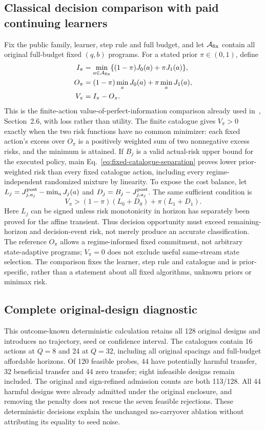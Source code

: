 \subsection{Classical decision comparison with paid continuing learners}
Fix the public family, learner, step rule and full budget, and let $\mathcal A_{\rm fix}$ contain all original full-budget fixed $(q,b)$ programs.
For a stated prior $\pi\in(0,1)$, define
\begin{align*}
I_\pi&=\min_{a\in\mathcal A_{\rm fix}}\{(1-\pi)J_0(a)+\pi J_1(a)\},\\
O_\pi&=(1-\pi)\min_aJ_0(a)+\pi\min_aJ_1(a),\\
V_\pi&=I_\pi-O_\pi.
\end{align*}
This is the finite-action value-of-perfect-information comparison already used in~, Section~2.6, with loss rather than utility.
The finite catalogue gives $V_\pi>0$ exactly when the two risk functions have no common minimizer: each fixed action's excess over $O_\pi$ is a positively weighted sum of two nonnegative excess risks, and the minimum is attained.
If $B_j$ is a valid actual-risk upper bound for the executed policy, main Eq.~\eqref{eq:fixed-catalogue-separation} proves lower prior-weighted risk than every fixed catalogue action, including every regime-independent randomized mixture by linearity.
To expose the cost balance, let $L_j=J_{j,a_j}^{\rm post}-\min_aJ_j(a)$ and $D_j=B_j-J_{j,a_j}^{\rm post}$.
The same sufficient condition is
\begin{equation}
V_\pi>(1-\pi)(L_0+D_0)+\pi(L_1+D_1).
\label{eq:supp-paid-opportunity}
\end{equation}
Here $L_j$ can be signed unless risk monotonicity in horizon has separately been proved for the affine transient.
Thus decision opportunity must exceed remaining-horizon and decision-event risk, not merely produce an accurate classification.
The reference $O_\pi$ allows a regime-informed fixed commitment, not arbitrary state-adaptive programs; $V_\pi=0$ does not exclude useful same-stream state selection.
The comparison fixes the learner, step rule and catalogue and is prior-specific, rather than a statement about all fixed algorithms, unknown priors or minimax risk.

\subsection{Complete original-design diagnostic}
This outcome-known deterministic calculation retains all 128 original designs and introduces no trajectory, seed or confidence interval.
The catalogues contain 16 actions at $Q=8$ and 24 at $Q=32$, including all original spacings and full-budget affordable horizons.
Of 120 feasible probes, 44 have potentially harmful transfer, 32 beneficial transfer and 44 zero transfer; eight infeasible designs remain included.
The original and sign-refined admission counts are both 113/128.
All 44 harmful designs were already admitted under the original enclosure, and removing the penalty does not rescue the seven feasible rejections.
These deterministic decisions explain the unchanged no-carryover ablation without attributing its equality to seed noise.

